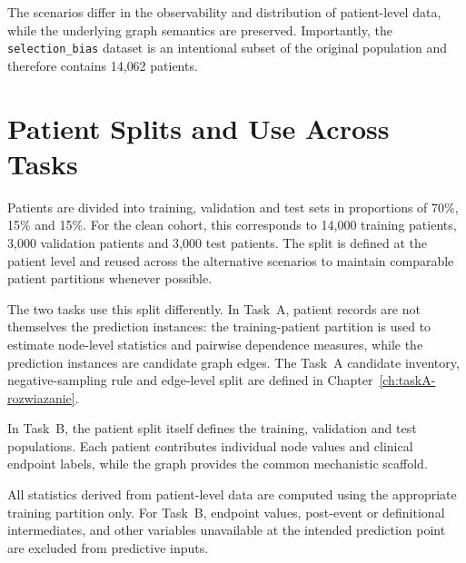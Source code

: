 The scenarios differ in the observability and distribution of patient-level data, while the underlying graph semantics are preserved.
Importantly, the \texttt{selection\_bias} dataset is an intentional subset of the original population and therefore contains 14{,}062 patients.

\section{Patient Splits and Use Across Tasks}

Patients are divided into training, validation and test sets in proportions of 70\%, 15\% and 15\%.
For the clean cohort, this corresponds to 14{,}000 training patients, 3{,}000 validation patients and 3{,}000 test patients.
The split is defined at the patient level and reused across the alternative scenarios to maintain comparable patient partitions whenever possible.

The two tasks use this split differently.
In Task~A, patient records are not themselves the prediction instances: the training-patient partition is used to estimate node-level statistics and pairwise dependence measures, while the prediction instances are candidate graph edges.
The Task~A candidate inventory, negative-sampling rule and edge-level split are defined in Chapter~\ref{ch:taskA-rozwiazanie}.

In Task~B, the patient split itself defines the training, validation and test populations.
Each patient contributes individual node values and clinical endpoint labels, while the graph provides the common mechanistic scaffold.

All statistics derived from patient-level data are computed using the appropriate training partition only.
For Task~B, endpoint values, post-event or definitional intermediates, and other variables unavailable at the intended prediction point are excluded from predictive inputs.
